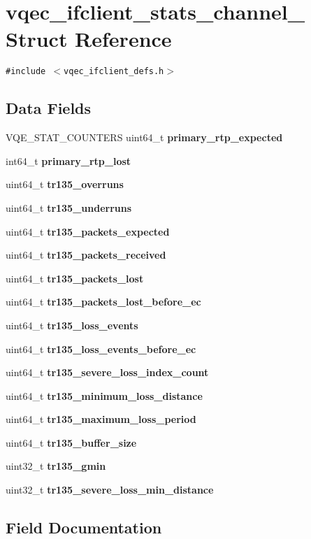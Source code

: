 \section{vqec\_\-ifclient\_\-stats\_\-channel\_\- Struct Reference}
\label{structvqec__ifclient__stats__channel__}
{\tt \#include $<$vqec\_\-ifclient\_\-defs.h$>$}

\subsection*{Data Fields}
\begin{CompactItemize}
\item 
VQE\_\-STAT\_\-COUNTERS uint64\_\-t \bf{primary\_\-rtp\_\-expected}
\item 
int64\_\-t \bf{primary\_\-rtp\_\-lost}
\item 
uint64\_\-t \bf{tr135\_\-overruns}
\item 
uint64\_\-t \bf{tr135\_\-underruns}
\item 
uint64\_\-t \bf{tr135\_\-packets\_\-expected}
\item 
uint64\_\-t \bf{tr135\_\-packets\_\-received}
\item 
uint64\_\-t \bf{tr135\_\-packets\_\-lost}
\item 
uint64\_\-t \bf{tr135\_\-packets\_\-lost\_\-before\_\-ec}
\item 
uint64\_\-t \bf{tr135\_\-loss\_\-events}
\item 
uint64\_\-t \bf{tr135\_\-loss\_\-events\_\-before\_\-ec}
\item 
uint64\_\-t \bf{tr135\_\-severe\_\-loss\_\-index\_\-count}
\item 
uint64\_\-t \bf{tr135\_\-minimum\_\-loss\_\-distance}
\item 
uint64\_\-t \bf{tr135\_\-maximum\_\-loss\_\-period}
\item 
uint64\_\-t \bf{tr135\_\-buffer\_\-size}
\item 
uint32\_\-t \bf{tr135\_\-gmin}
\item 
uint32\_\-t \bf{tr135\_\-severe\_\-loss\_\-min\_\-distance}
\end{CompactItemize}


\subsection{Field Documentation}
